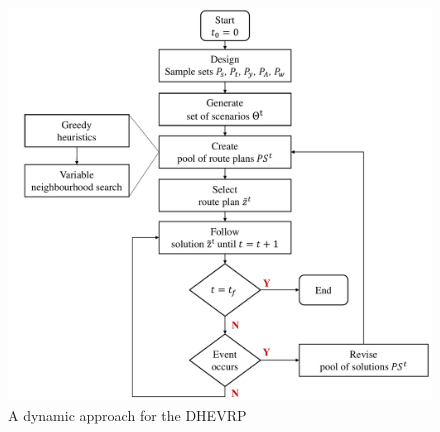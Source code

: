 \documentclass[11pt]{article}
\begin{document}
\begin{figure}[H]
\begin{centering}
  \includegraphics[width=0.79\linewidth]{Figure2.pdf}
    \caption{A dynamic approach for the DHEVRP}
     \label{Fig2}
     \end{centering}
\end{figure}

\end{document}

